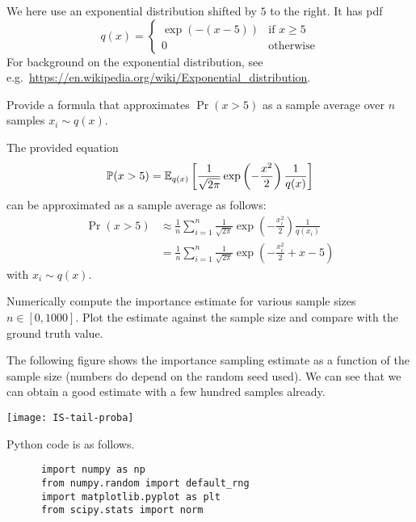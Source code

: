 \begin{exenumerate}
  We here use an exponential distribution shifted by $5$ to the right. It has pdf
  \begin{equation}
    q(x) = \begin{cases}
      \exp(- (x-5)) & \text{if } x\ge 5\\
      0 & \text{otherwise}
    \end{cases}
  \end{equation}
  For background on the exponential distribution, see
  e.g.\ \url{https://en.wikipedia.org/wiki/Exponential_distribution}.
  
  Provide a formula that approximates $\Pr(x>5)$ as a sample average
  over $n$ samples $x_i \sim q(x)$.

  \begin{solution}
    The provided equation
    \begin{equation}
      \mathbb{P}(x>5)= \mathbb{E}_{q(x)} \left[\frac{1}{\sqrt{2\pi}} \exp\left(-\frac{x^2}{2}\right) \frac{1}{q(x)}\right]
    \end{equation}
    can be approximated as a sample average as follows:
    \begin{align}
      \Pr(x>5) &\approx \frac{1}{n} \sum_{i=1}^n \frac{1}{\sqrt{2\pi}} \exp\left(-\frac{x_i^2}{2}\right) \frac{1}{q(x_i)}\\
      & = \frac{1}{n} \sum_{i=1}^n  \frac{1}{\sqrt{2\pi}} \exp\left(-\frac{x_i^2}{2} + x-5\right)
    \end{align}
    with $x_i \sim q(x)$.
  \end{solution}
  
\item Numerically compute the importance estimate for various sample sizes $n
  \in [0, 1000]$. Plot the estimate against the sample size and
  compare with the ground truth value.

  \begin{solution}
    The following figure shows the importance sampling estimate as a
    function of the sample size (numbers do depend on the random seed
    used). We can see that we can obtain a good estimate with a few
    hundred samples already.
    \begin{center}
      \texttt{[image: IS-tail-proba]}
    \end{center}

    Python code is as follows.
    \begin{lstlisting}
      import numpy as np
      from numpy.random import default_rng
      import matplotlib.pyplot as plt
      from scipy.stats import norm


\end{lstlisting}
\end{solution}
\end{exenumerate}
